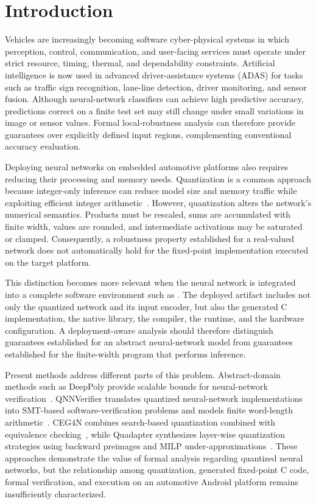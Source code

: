 
\section{Introduction}
\label{sec:introduction}
Vehicles are increasingly becoming software cyber-physical systems in which perception, control, communication, and user-facing services must operate under strict resource, timing, thermal, and dependability constraints. Artificial intelligence is now used in advanced driver-assistance systems (ADAS) for tasks such as traffic sign recognition, lane-line detection, driver monitoring, and sensor fusion. Although neural-network classifiers can achieve high predictive accuracy, predictions correct on a finite test set may still change under small variations in image or sensor values. Formal local-robustness analysis can therefore provide guarantees over explicitly defined input regions, complementing conventional accuracy evaluation.

Deploying neural networks on embedded automotive platforms also requires reducing their processing and memory needs. Quantization is a common approach because integer-only inference can reduce model size and memory traffic while exploiting efficient integer arithmetic~\cite{Jacob2018Integer}. However, quantization alters the network's numerical semantics. Products must be rescaled, sums are accumulated with finite width, values are rounded, and intermediate activations may be saturated or clamped. Consequently, a robustness property established for a real-valued network does not automatically hold for the fixed-point implementation executed on the target platform.

This distinction becomes more relevant when the neural network is integrated into a complete software environment such as \AAOS{}. The deployed artifact includes not only the quantized network and its input encoder, but also the generated C implementation, the native library, the compiler, the runtime, and the hardware configuration. A deployment-aware analysis should therefore distinguish guarantees established for an abstract neural-network model from guarantees established for the finite-width program that performs inference.

Present methods address different parts of this problem. Abstract-domain methods such as DeepPoly provide scalable bounds for neural-network verification~\cite{Singh2019DeepPoly}. QNNVerifier translates quantized neural-network implementations into SMT-based software-verification problems and models finite word-length arithmetic~\cite{Song2021QNNVerifier}. CEG4N combines search-based quantization combined with equivalence checking~\cite{Matos2022CEG4N}, while Quadapter synthesizes layer-wise quantization strategies using backward preimages and MILP under-approximations~\cite{Zhang2024Quadapter}. These approaches demonstrate the value of formal analysis regarding quantized neural networks, but the relationship among quantization, generated fixed-point C code, formal verification, and execution on an automotive Android platform remains insufficiently characterized.

